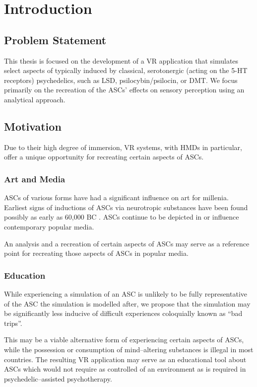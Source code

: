 \chapter{Introduction}\label{sec:introduction}

\section{Problem Statement}
This thesis is focused on the development of a \ac{VR} application that simulates select aspects of  typically induced by classical, serotonergic (acting on the \acs{5-HT} receptors) psychedelics, such as \acs{LSD}, psilocybin/psilocin, or \acs{DMT}.
We focus primarily on the recreation of the \acp{ASC}' effects on sensory perception using an analytical approach.

\section{Motivation}
Due to their high degree of immersion, \ac{VR} systems, with \acp{HMD} in particular, offer a unique opportunity for recreating certain aspects of \acp{ASC}.

\subsection{Art and Media}
\Acp{ASC} of various forms have had a significant influence on art for millenia. Earliest signs of inductions of \acp{ASC} via neurotropic substances have been found possibly as early as 60,000 BC \autocite{guerra2015psychoactive}. \Acp{ASC} continue to be depicted in or influence contemporary popular media.

An analysis and a recreation of certain aspects of \acp{ASC} may serve as a reference point for recreating those aspects of \acp{ASC} in popular media.

\subsection{Education}
While experiencing a simulation of an \ac{ASC} is unlikely to be fully representative of the \ac{ASC} the simulation is modelled after, we propose that the simulation may be significantly less inducive of difficult experiences coloquially known as ``bad trips''.

This may be a viable alternative form of experiencing certain aspects of \acp{ASC}, while the possession or consumption of mind--altering substances is illegal in most countries. The resulting \ac{VR} application may serve as an educational tool about \acp{ASC} which would not require as controlled of an environment as is required in psychedelic--assisted psychotherapy.

